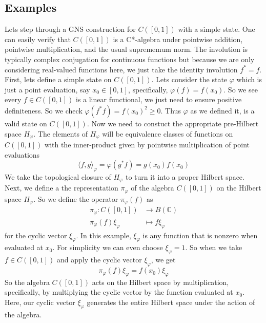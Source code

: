 \subsection{Examples}
\begin{example}
Lets step through a GNS construction for \( C([0,1]) \) with a simple state. One
can easily verify that $C([0,1])$ is a C*-algebra under pointwise addition, pointwise
multiplication, and the usual suprememum norm. The involution is typically complex
conjugation for continuous functions but because we are only considering real-valued
functions here, we just take the identity involution $f^*=f$. First, lets define a simple state
on $C([0,1])$. Lets consider the state $\varphi$ which is just a point evaluation,
say $x_0 \in [0,1]$, specifically, $\varphi(f) = f(x_0)$. So we see every $f \in C([0,1])$
is a linear functional, we just need to ensure positive definiteness. So we check
$\varphi(f^*f) = f(x_0)^2 \ge 0$. Thus $\varphi$ as we defined it, is a valid state
on $C([0,1])$. Now we need to constuct the appropriate pre-Hilbert space $H_\varphi$.
The elements of $H_\varphi$ will be equivalence classes of functions on $C([0,1])$
with the inner-product given by pointwise multiplication of point evaluations
\begin{equation*}
    \langle f,g \rangle_\varphi = \varphi(g^*f) = g(x_0)f(x_0)
\end{equation*}
We take the topological closure of $H_\varphi$ to turn it into a proper Hilbert space.
Next, we define a the representation $\pi_\varphi$ of the algebra $C([0,1])$ on
the Hilbert space $H_\varphi$. So we define the operator $\pi_\varphi (f)$ as
\begin{align*}
    \pi_\varphi: C([0,1]) &\to B(\mathbb{C})\\
    \pi_\varphi (f)\xi_\varphi &\mapsto f \xi_\varphi
\end{align*}
for the cyclic vector $\xi_\varphi$. In this example, $\xi_\varphi$ is any function
that is nonzero when evaluated at $x_0$. For simplicity we can even choose $\xi_\varphi = 1$.
So when we take $f \in C([0,1])$ and apply the cyclic vector $\xi_\varphi$, we get
\begin{equation*}
    \pi_\varphi (f) \xi_\varphi = f(x_0) \xi_\varphi
\end{equation*}
So the algebra $C([0,1])$ acts on the Hilbert space by multiplication, specifically,
by multiplying the cyclic vector by the function evaluated at $x_0$. Here, our cyclic
vector $\xi_\varphi$ generates the entire Hilbert space under the action of the algebra.

\end{example}
